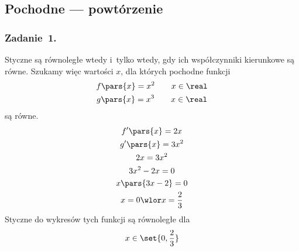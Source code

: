 \subsection*{Pochodne --- powtórzenie}
\subsubsection*{Zadanie~1.}
Styczne są równoległe wtedy i~tylko wtedy, gdy ich współczynniki kierunkowe są równe. Szukamy więc wartości \(x\), dla których pochodne funkcji
\begin{gather*}
    f\pars{x} = x^2 \qquad x \in \real\\
    g\pars{x} = x^3 \qquad x \in \real
\end{gather*}
są równe.
\begin{gather*}
    f'\pars{x} = 2x\\
    g'\pars{x} = 3x^2\\
    2x = 3x^2\\
    3x^2 - 2x = 0\\
    x\pars{3x - 2} = 0\\
    x = 0 \wlor x = \frac{2}{3}
\end{gather*}
Styczne do wykresów tych funkcji są równoległe dla
\begin{equation*}
    x \in \set{0, \frac{2}{3}}
\end{equation*}
